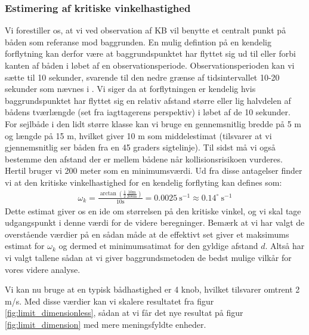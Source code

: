 \documentclass[%
 reprint,
nofootinbib,
aps,
]{revtex4-1}
\begin{document}
\subsubsection{Estimering af kritiske vinkelhastighed}
Vi forestiller os, at vi ved observation af KB vil benytte et centralt punkt på båden som referanse mod baggrunden. En mulig defintion på en kendelig forflytning kan derfor være at baggrundspunktet har flyttet sig ud til eller forbi kanten af båden i løbet af en observationsperiode. Observationsperioden kan vi sætte til 10 sekunder, svarende til den nedre grænse af tidsintervallet 10-20 sekunder som nævnes i \cite{duelighed}. Vi siger da at forflytningen er kendelig hvis baggrundspunktet har flyttet sig en relativ afstand større eller lig halvdelen af bådens tværlængde (set fra iagttagerens perspektiv) i løbet af de 10 sekunder. For sejlbåde i den lidt større klasse kan vi bruge en gennemsnitlig bredde på 5 m og længde på 15 m, hvilket giver 10 m som middelestimat (tilsvarer at vi gjennemsnitlig ser båden fra en 45 graders sigtelinje). Til sidst må vi også bestemme den afstand der er mellem bådene når kollisionsrisikoen vurderes. Hertil bruger vi 200 meter som en minimumsværdi. Ud fra disse antagelser finder vi at den kritiske vinkelhastighed for en kendelig forflyting kan defines som:
\begin{align}
  \omega_k = \frac{\arctan{(\frac{1}{2}\frac{10 \text{m}}{200 \text{m}})}}{10 \text{s}} = 0.0025 \ \text{s}^{-1} \approx  0.14^{\circ}\ \text{s}^{-1}
  \label{eq:omega_k}
\end{align}
Dette estimat giver os en ide om størrelsen på den kritiske vinkel, og vi skal tage udgangspunkt i denne værdi for de videre beregninger. Bemærk at vi har valgt de overstående værdier på en sådan måde at de effektivt set giver et maksimums estimat for $\omega_k$ og dermed et minimumsatimat for den gyldige afstand $d$. Altså har vi valgt tallene sådan at vi giver baggrundsmetoden de bedst mulige vilkår for vores videre analyse. \par
%
Vi kan nu bruge at en typisk bådhastighed er 4 knob, hvilket tilsvarer omtrent 2 m/s. Med disse værdier kan vi skalere resultatet fra figur \ref{fig:limit_dimensionless}, sådan at vi får det nye resultat på figur \ref{fig:limit_dimension} med mere meningsfyldte enheder.
\end{document}
